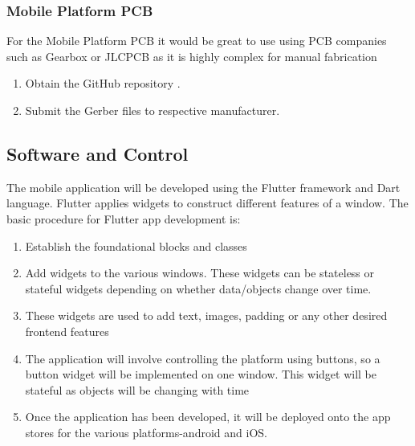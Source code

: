 \subsubsection{Mobile Platform PCB}
For the Mobile Platform PCB it would be great to use using PCB companies such as Gearbox or JLCPCB as it is highly complex for manual fabrication
\begin{enumerate}
    \item Obtain the GitHub repository \cite{gerber_files}.
    \item Submit the Gerber files to respective manufacturer.
\end{enumerate}

\subsection{Software and Control}
The mobile application will be developed using the Flutter framework and Dart language. Flutter applies widgets to construct different features of a window. The basic procedure for Flutter app development is:
\begin{enumerate}
    \item Establish the foundational blocks and classes
    \item Add widgets to the various windows. These widgets can be stateless or stateful widgets depending on whether data/objects change over time.
    \item These widgets are used to add text, images, padding or any other desired frontend features
    \item The application will involve controlling the platform using buttons, so a button widget will be implemented on one window. This widget will be stateful as objects will be changing with time
    \item Once the application has been developed, it will be deployed onto the app stores for the various platforms-android and iOS.
\end{enumerate}